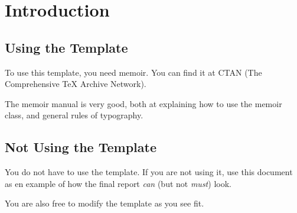 \chapter{Introduction}
\section{Using the Template}
To use this template, you need memoir. You can find it at CTAN (The Comprehensive \TeX{} Archive Network). 

The memoir manual is very good, both at explaining how to use the memoir class, and general rules of typography. 



\section{Not Using the Template}
You do not have to use the template. If you are not using it, use this document as en example of how the final report \emph{can} (but not \emph{must}) look. 

You are also free to modify the template as you see fit. 